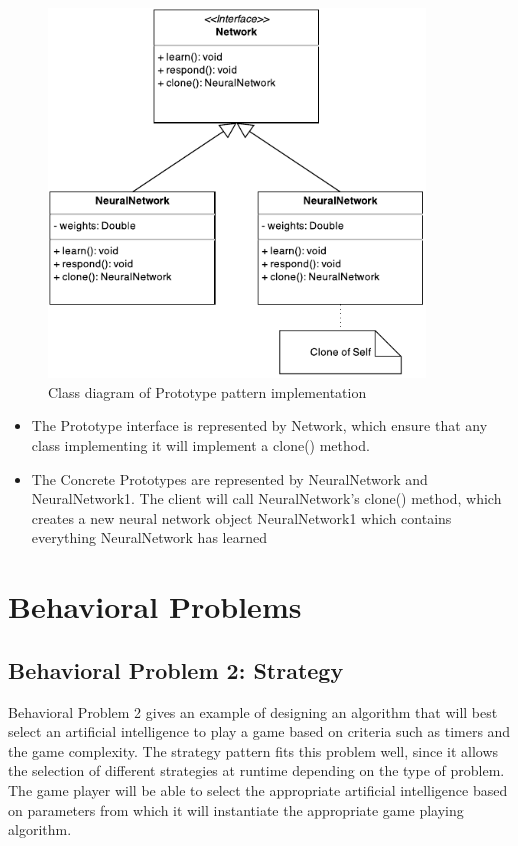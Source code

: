 \documentclass[11pt]{article}
\begin{document}
\begin{figure}[!htb]
  \begin{center}
    \includegraphics[width=100mm]{Prototype.pdf}
    \caption{Class diagram of Prototype pattern implementation}
    \label{fig:prototype}
  \end{center} 
\end{figure}

\begin{itemize}
\item The Prototype interface is represented by {\ttfamily Network}, which 
  ensure that any class implementing it will implement a {\ttfamily clone()} 
  method.
\item The Concrete Prototypes are represented by {\ttfamily NeuralNetwork} and
  {\ttfamily NeuralNetwork1}. The client will call {\ttfamily NeuralNetwork}'s 
  {\ttfamily clone()} method, which creates a new neural network object
  {\ttfamily NeuralNetwork1} which contains everything {\ttfamily NeuralNetwork}
  has learned
\end{itemize}


\newpage
\section{Behavioral Problems}
\subsection{Behavioral Problem 2: Strategy}

Behavioral Problem 2 gives an example of designing an algorithm that will best
select an artificial intelligence to play a game based on criteria such as 
timers and the game complexity. The strategy pattern fits this problem well, 
since it allows the selection of different strategies at runtime depending on 
the type of problem. The game player will be able to select the appropriate 
artificial intelligence based on parameters from which it will instantiate the
appropriate game playing algorithm.
\end{document}
